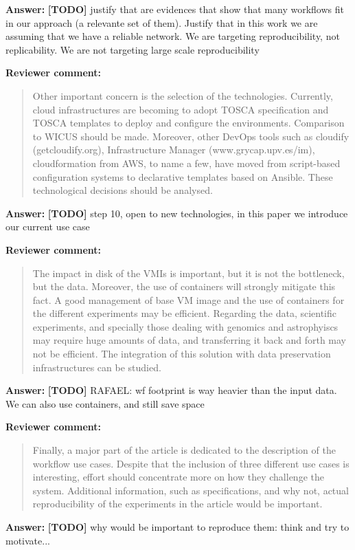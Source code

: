 \documentclass{letter}
\newenvironment{review}%
{\textbf{Reviewer comment:}\begin{quote}}%
{\end{quote}}%
\newcommand{\todo}[1]{%
      \color{red}\textbf{[TODO]} #1\color{black}}
\newcommand{\answer}[1]{%
      \textbf{Answer:} #1}
\newcommand{\revised}[1]{\emph{#1}\color{black}}
\begin{document}
\begin{letter}{}
\answer{\todo{justify that are evidences that show that many workflows fit in our approach (a relevante set of them). Justify that in this work we are assuming that we have a reliable network. We are targeting reproducibility, not replicability. We are not targeting large scale reproducibility}}

\revised{}


\begin{review}
Other important concern is the selection of the technologies. Currently, cloud infrastructures are becoming to adopt TOSCA specification and TOSCA templates to deploy and configure the environments. Comparison to WICUS should be made. Moreover, other DevOps tools such as cloudify (getcloudify.org), Infrastructure Manager (www.grycap.upv.es/im), cloudformation from AWS, to name a few, have moved from script-based configuration systems to declarative templates based on Ansible. These technological decisions should be analysed.
\end{review}

\answer{\todo{step 10, open to new technologies, in this paper we introduce our current use case}}


\begin{review}
The impact in disk of the VMIs is important, but it is not the bottleneck, but the data. Moreover, the use of containers will strongly mitigate this fact. A good management of base VM image and the use of containers for the different experiments may be efficient. Regarding the data, scientific experiments, and specially those dealing with genomics and astrophyiscs may require huge amounts of data, and transferring it back and forth may not be efficient. The integration of this solution with data preservation infrastructures can be studied.
\end{review}

\answer{\todo{RAFAEL: wf footprint is way heavier than the input data. We can also use containers, and still save space}}


\begin{review}
Finally, a major part of the article is dedicated to the description of the workflow use cases. Despite that the inclusion of three different use cases is interesting, effort should concentrate more on how they challenge the system. Additional information, such as specifications, and why not, actual reproducibility of the experiments in the article would be important.
\end{review}

\answer{\todo{why would be important to reproduce them: think and try to motivate...}}


\end{letter}
\end{document}
